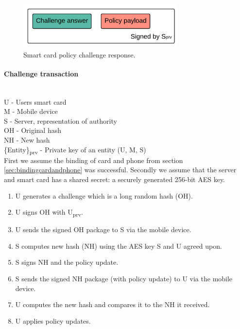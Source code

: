 \begin{figure}[h!]
  \caption{Smart card policy challenge response.}
  \label{fig:NH}
  \centering
    \includegraphics[width=0.75\textwidth]{images/challenge_response.png}
\end{figure}

\newpage

\paragraph{Challenge transaction}\mbox{}\\

U - Users smart card \\
M - Mobile device \\
S - Server, representation of authority \\
OH - Original hash \\
NH - New hash \\
\{Entity\}\textsubscript{prv} - Private key of an entity (U, M, S)\\

First we assume the binding of card and phone from section \ref{sec:bindingcardandphone} was successful. Secondly we assume that the server and smart card has a shared secret: a securely generated 256-bit AES key.

\begin{enumerate}
    \item U generates a challenge which is a long random hash (OH).
    \item U signs OH with U\textsubscript{prv}.
    \item U sends the signed OH package to S via the mobile device.
    \item S computes new hash (NH) using the AES key S and U agreed upon.
    \item S signs NH and the policy update.
    \item S sends the signed NH package (with policy update) to U via the mobile device.
    \item U computes the new hash and compares it to the NH it received.
    \item U applies policy updates.
\end{enumerate}

